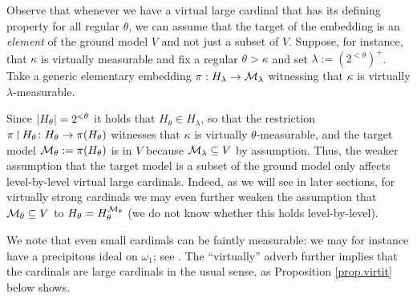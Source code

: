 \documentclass[../../main]{subfiles}
\begin{document}
\qquad Observe that whenever we have a virtual large cardinal that has its defining property for all regular $\theta$, we can assume that the target of the embedding is an \textit{element} of the ground model $V$ and not just a subset of $V$. Suppose, for instance, that $\kappa$ is virtually measurable and fix a regular $\theta>\kappa$ and set $\lambda:=(2^{<\theta})^+$. Take a generic elementary embedding $\pi:H_\lambda\to \operatorname{\mathcal M}_\lambda$ witnessing that $\kappa$ is virtually $\lambda$-measurable. 

\qquad Since $\left|H_\theta\right|=2^{<\theta}$ it holds that $H_\theta\in H_\lambda$, so that the restriction $\pi\operatorname{\upharpoonright} H_\theta\colon H_\theta\to\pi(H_\theta)$ witnesses that $\kappa$ is virtually $\theta$-measurable, and the target model $\operatorname{\mathcal M}_\theta := \pi(H_\theta)$ is in $V$ because $\operatorname{\mathcal M}_\lambda\subseteq V$ by assumption. Thus, the weaker assumption that the target model is a subset of the ground model only affects level-by-level virtual large cardinals. Indeed, as we will see in later sections, for virtually strong cardinals we may even further weaken the assumption that $\operatorname{\mathcal M}_\theta\subseteq V$ to $H_\theta=H_\theta^{\operatorname{\mathcal M}_\theta}$ (we do not know whether this holds level-by-level).

\qquad We note that even small cardinals can be faintly measurable: we may for instance have a precipitous ideal on $\omega_1$; see \cite[Theorem 22.33]{Jech}. The ``virtually'' adverb further implies that the cardinals are large cardinals in the usual sense, as Proposition \ref{prop.virtit} below shows.

\end{document}
